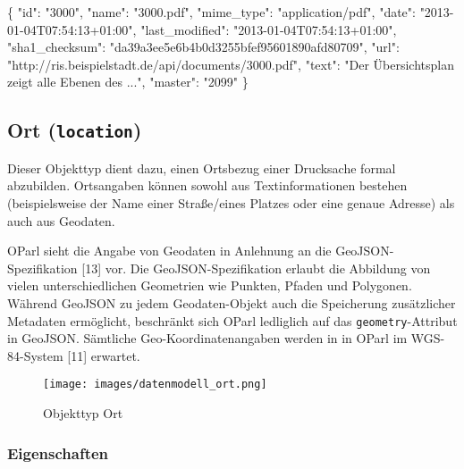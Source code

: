 \documentclass[,a4paper]{article}
\makeatletter
\newenvironment{Shaded}{}{}
\newcommand{\DataTypeTok}[1]{\textcolor[rgb]{0.56,0.13,0.00}{{#1}}}
\newcommand{\StringTok}[1]{\textcolor[rgb]{0.25,0.44,0.63}{{#1}}}
\newcommand{\NormalTok}[1]{{#1}}
\def\maxwidth{\ifdim\Gin@nat@width>\linewidth\linewidth
\else\Gin@nat@width\fi}
\let\Oldincludegraphics\includegraphics
\renewcommand{\includegraphics}[1]{\Oldincludegraphics[width=\maxwidth]{#1}}
\makeatother
\begin{document}
\begin{Shaded}
\begin{Highlighting}[]
\NormalTok{\{}
    \DataTypeTok{"id"}\NormalTok{: }\StringTok{"3000"}\NormalTok{,}
    \DataTypeTok{"name"}\NormalTok{: }\StringTok{"3000.pdf"}\NormalTok{,}
    \DataTypeTok{"mime_type"}\NormalTok{: }\StringTok{"application/pdf"}\NormalTok{,}
    \DataTypeTok{"date"}\NormalTok{: }\StringTok{"2013-01-04T07:54:13+01:00"}\NormalTok{,}
    \DataTypeTok{"last_modified"}\NormalTok{: }\StringTok{"2013-01-04T07:54:13+01:00"}\NormalTok{,}
    \DataTypeTok{"sha1_checksum"}\NormalTok{: }\StringTok{"da39a3ee5e6b4b0d3255bfef95601890afd80709"}\NormalTok{,}
    \DataTypeTok{"url"}\NormalTok{: }\StringTok{"http://ris.beispielstadt.de/api/documents/3000.pdf"}\NormalTok{,}
    \DataTypeTok{"text"}\NormalTok{: }\StringTok{"Der Übersichtsplan zeigt alle Ebenen des ..."}\NormalTok{,}
    \DataTypeTok{"master"}\NormalTok{: }\StringTok{"2099"}
\NormalTok{\}}
\end{Highlighting}
\end{Shaded}

\subsection{Ort (\texttt{location})}

Dieser Objekttyp dient dazu, einen Ortsbezug einer Drucksache formal
abzubilden. Ortsangaben können sowohl aus Textinformationen bestehen
(beispielsweise der Name einer Straße/eines Platzes oder eine genaue
Adresse) als auch aus Geodaten.

OParl sieht die Angabe von Geodaten in Anlehnung an die
GeoJSON-Spezifikation {[}13{]} vor. Die GeoJSON-Spezifikation erlaubt
die Abbildung von vielen unterschiedlichen Geometrien wie Punkten,
Pfaden und Polygonen. Während GeoJSON zu jedem Geodaten-Objekt auch die
Speicherung zusätzlicher Metadaten ermöglicht, beschränkt sich OParl
ledliglich auf das \texttt{geometry}-Attribut in GeoJSON. Sämtliche
Geo-Koordinatenangaben werden in in OParl im WGS-84-System {[}11{]}
erwartet.

\begin{figure}[htbp]
\centering
\texttt{[image: images/datenmodell\_ort.png]}
\caption{Objekttyp Ort}
\end{figure}

\subsubsection{Eigenschaften}
\end{document}
